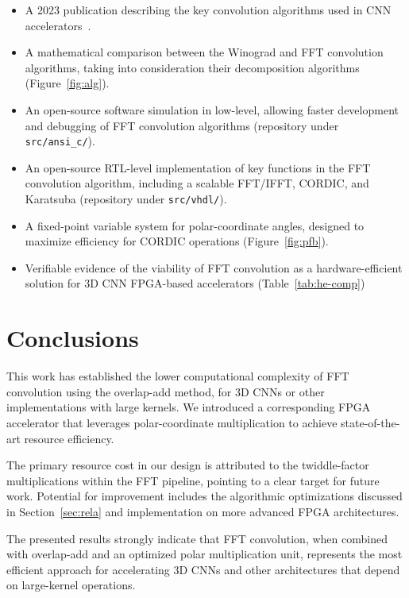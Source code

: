 \begin{itemize}
  \item A 2023 publication describing the key convolution algorithms used in CNN accelerators~\cite{lera2023hardware}.
  \item A mathematical comparison between the Winograd and FFT convolution algorithms, taking into consideration their decomposition algorithms (Figure~\ref{fig:alg}).
  \item An open-source software simulation in low-level, allowing faster development and debugging of FFT convolution algorithms (repository under \texttt{src/ansi\_c/}).
  \item An open-source RTL-level implementation of key functions in the FFT convolution algorithm, including a scalable FFT/IFFT, CORDIC, and Karatsuba (repository under \texttt{src/vhdl/}).
  \item A fixed-point variable system for polar-coordinate angles, designed to maximize efficiency for CORDIC operations (Figure~\ref{fig:pfb}).
  \item Verifiable evidence of the viability of FFT convolution as a hardware-efficient solution for 3D CNN FPGA-based accelerators (Table~\ref{tab:he-comp})
\end{itemize}

\chapter{Conclusions}\label{ch:con}
This work has established the lower computational complexity of FFT convolution using the overlap-add method, for 3D CNNs or other implementations with large kernels. We introduced a corresponding FPGA accelerator that leverages polar-coordinate multiplication to achieve state-of-the-art resource efficiency. 
  
The primary resource cost in our design is attributed to the twiddle-factor multiplications within the FFT pipeline, pointing to a clear target for future work. Potential for improvement includes the algorithmic optimizations discussed in Section~\ref{sec:rela} and implementation on more advanced FPGA architectures. 

The presented results strongly indicate that FFT convolution, when combined with overlap-add and an optimized polar multiplication unit, represents the most efficient approach for accelerating 3D CNNs and other architectures that depend on large-kernel operations.